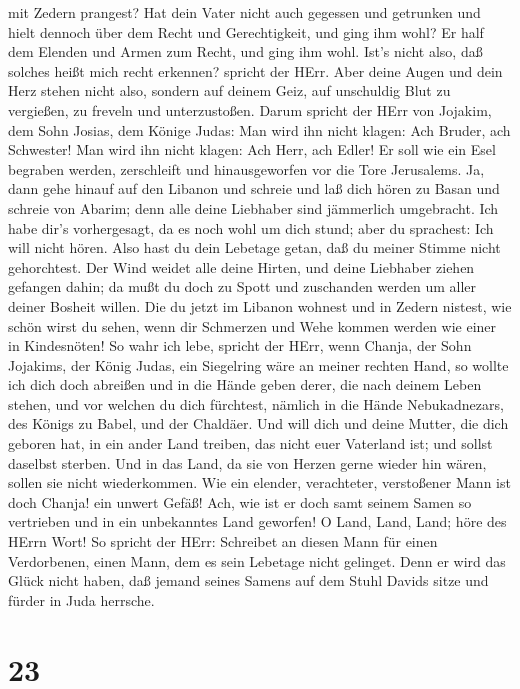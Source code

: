 mit Zedern prangest? Hat dein Vater nicht auch gegessen und getrunken
und hielt dennoch über dem Recht und Gerechtigkeit, und ging ihm wohl?
 Er half dem Elenden und Armen zum Recht, und ging ihm
wohl. Ist's nicht also, daß solches heißt mich recht erkennen? spricht
der HErr.  Aber deine Augen und dein Herz stehen nicht
also, sondern auf deinem Geiz, auf unschuldig Blut zu vergießen, zu
freveln und unterzustoßen.  Darum spricht der HErr von
Jojakim, dem Sohn Josias, dem Könige Judas: Man wird ihn nicht klagen:
Ach Bruder, ach Schwester! Man wird ihn nicht klagen: Ach Herr, ach
Edler!  Er soll wie ein Esel begraben werden, zerschleift
und hinausgeworfen vor die Tore Jerusalems.  Ja, dann gehe
hinauf auf den Libanon und schreie und laß dich hören zu Basan und
schreie von Abarim; denn alle deine Liebhaber sind jämmerlich
umgebracht.  Ich habe dir's vorhergesagt, da es noch wohl
um dich stund; aber du sprachest: Ich will nicht hören. Also hast du
dein Lebetage getan, daß du meiner Stimme nicht gehorchtest.
 Der Wind weidet alle deine Hirten, und deine Liebhaber
ziehen gefangen dahin; da mußt du doch zu Spott und zuschanden werden um
aller deiner Bosheit willen.  Die du jetzt im Libanon
wohnest und in Zedern nistest, wie schön wirst du sehen, wenn dir
Schmerzen und Wehe kommen werden wie einer in Kindesnöten! 
So wahr ich lebe, spricht der HErr, wenn Chanja, der Sohn Jojakims, der
König Judas, ein Siegelring wäre an meiner rechten Hand, so wollte ich
dich doch abreißen  und in die Hände geben derer, die nach
deinem Leben stehen, und vor welchen du dich fürchtest, nämlich in die
Hände Nebukadnezars, des Königs zu Babel, und der Chaldäer.
 Und will dich und deine Mutter, die dich geboren hat, in
ein ander Land treiben, das nicht euer Vaterland ist; und sollst
daselbst sterben.  Und in das Land, da sie von Herzen gerne
wieder hin wären, sollen sie nicht wiederkommen.  Wie ein
elender, verachteter, verstoßener Mann ist doch Chanja! ein unwert
Gefäß! Ach, wie ist er doch samt seinem Samen so vertrieben und in ein
unbekanntes Land geworfen!  O Land, Land, Land; höre des
HErrn Wort!  So spricht der HErr: Schreibet an diesen Mann
für einen Verdorbenen, einen Mann, dem es sein Lebetage nicht gelinget.
Denn er wird das Glück nicht haben, daß jemand seines Samens auf dem
Stuhl Davids sitze und fürder in Juda herrsche.

\hypertarget{section-22}{%
\section{23}\label{section-22}}


